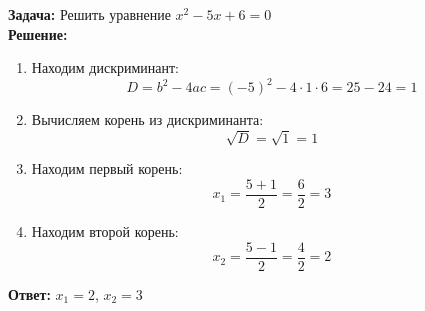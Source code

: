 \documentclass[12pt]{article}
\begin{document}
\noindent \textbf{Задача:} Решить уравнение $x^2 - 5x + 6 = 0$ \\

\noindent \textbf{Решение:}

\begin{enumerate}
    \item Находим дискриминант:
    \[
    D = b^2 - 4ac = (-5)^2 - 4 \cdot 1 \cdot 6 = 25 - 24 = 1
    \]
    
    \item Вычисляем корень из дискриминанта:
    \[
    \sqrt{D} = \sqrt{1} = 1
    \]
    
    \item Находим первый корень:
    \[
    x_1 = \frac{5 + 1}{2} = \frac{6}{2} = 3
    \]
    
    \item Находим второй корень:
    \[
    x_2 = \frac{5 - 1}{2} = \frac{4}{2} = 2
    \]
\end{enumerate}

\noindent \textbf{Ответ:} $x_1 = 2$, $x_2 = 3$
\end{document}
